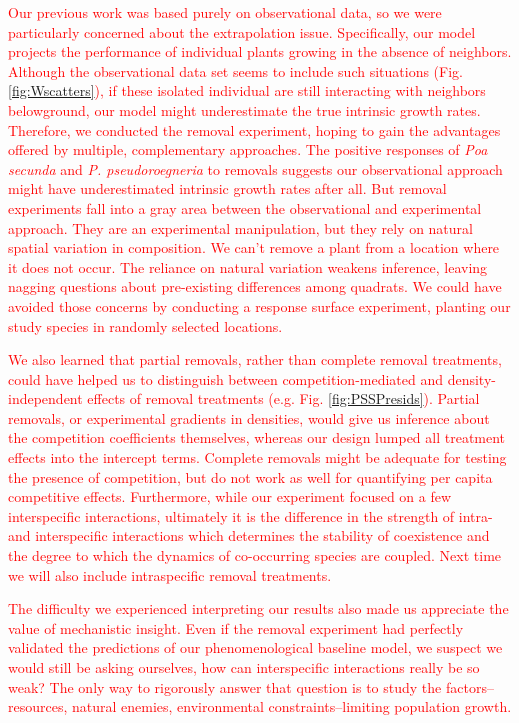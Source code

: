 \documentclass[11pt]{article}
\newcommand{\new}{\textcolor{red}}
\begin{document}
\begin{doublespacing}
\new{ Our previous work was based purely on observational data, so we were particularly concerned about the extrapolation issue.
Specifically, our model projects the performance of individual plants growing in the absence of neighbors. Although the observational data set seems to include such situations (Fig. \ref{fig:Wscatters}), if these isolated individual are still interacting with neighbors belowground, our model might underestimate the true intrinsic growth rates. Therefore, we conducted the removal experiment, hoping to gain the advantages offered by multiple, complementary approaches. The positive responses of \textit{Poa secunda} and \textit{P. pseudoroegneria} to removals suggests our observational approach might have underestimated intrinsic growth rates after all. But removal experiments fall into a gray area between the observational and experimental approach. They are an experimental manipulation, but they rely on natural spatial variation in composition. We can't remove a plant from a location where it does not occur. The reliance on natural variation weakens inference, leaving nagging questions about pre-existing differences among quadrats. We could have avoided those concerns by conducting a response surface experiment, planting our study species in randomly selected locations. }

\new{We also learned that partial removals, rather than complete removal treatments, could 
have helped us to distinguish between competition-mediated and density-independent effects of removal treatments (e.g. Fig. \ref{fig:PSSPresids}).
Partial removals, or experimental gradients in densities, would give us inference about the competition coefficients themselves, whereas our 
design lumped all treatment effects into the intercept terms. Complete removals might be adequate for testing the presence of competition, but do not work as well for quantifying per capita competitive effects. 
Furthermore, while our experiment focused on a few interspecific interactions, ultimately it is the difference in the strength of intra- and interspecific interactions which determines the stability of coexistence and the degree to which the dynamics of co-occurring species are coupled. Next time we will also include intraspecific removal treatments.  }

\new{The difficulty we experienced interpreting our results also made us appreciate the value of mechanistic insight. Even if the removal experiment had perfectly validated the predictions of our phenomenological baseline model, we suspect we would still be asking ourselves, how can interspecific interactions really be so weak? The only way to rigorously answer that question is to study the factors--resources, natural enemies, environmental constraints--limiting population growth. }


\end{doublespacing}
\end{document}
